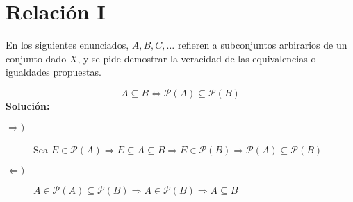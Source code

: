 \section{Relación I}
En los siguientes enunciados, $A, B, C, \ldots$ refieren a subconjuntos arbirarios de un conjunto dado $X$, y se pide demostrar la veracidad de las equivalencias o igualdades propuestas.

\begin{ejercicio}
    \begin{equation*}
        A \subseteq B \Longleftrightarrow \mathcal{P}(A) \subseteq \mathcal{P}(B)
    \end{equation*}
    \textbf{Solución:}
    \begin{description}
        \item [$\Longrightarrow)$] Sea $E\in \mathcal{P}(A) \Longrightarrow E\subseteq A\subseteq B \Longrightarrow E\in \mathcal{P}(B) \Longrightarrow \mathcal{P}(A)\subseteq \mathcal{P}(B)$
        \item [$\Longleftarrow)$] $A\in \mathcal{P}(A)\subseteq \mathcal{P}(B)\Longrightarrow A\in \mathcal{P}(B) \Longrightarrow A\subseteq B$
    \end{description}
\end{ejercicio}

